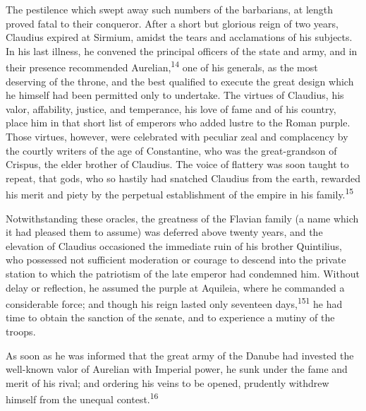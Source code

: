 The pestilence which swept away such numbers of the barbarians,
at length proved fatal to their conqueror. After a short but
glorious reign of two years, Claudius expired at Sirmium, amidst
the tears and acclamations of his subjects. In his last illness,
he convened the principal officers of the state and army, and in
their presence recommended Aurelian,\textsuperscript{14} one of his generals, as
the most deserving of the throne, and the best qualified to
execute the great design which he himself had been permitted only
to undertake. The virtues of Claudius, his valor, affability,
justice, and temperance, his love of fame and of his country,
place him in that short list of emperors who added lustre to the
Roman purple. Those virtues, however, were celebrated with
peculiar zeal and complacency by the courtly writers of the age
of Constantine, who was the great-grandson of Crispus, the elder
brother of Claudius. The voice of flattery was soon taught to
repeat, that gods, who so hastily had snatched Claudius from the
earth, rewarded his merit and piety by the perpetual
establishment of the empire in his family.\textsuperscript{15}



Notwithstanding these oracles, the greatness of the Flavian
family (a name which it had pleased them to assume) was deferred
above twenty years, and the elevation of Claudius occasioned the
immediate ruin of his brother Quintilius, who possessed not
sufficient moderation or courage to descend into the private
station to which the patriotism of the late emperor had condemned
him. Without delay or reflection, he assumed the purple at
Aquileia, where he commanded a considerable force; and though his
reign lasted only seventeen days,\textsuperscript{151} he had time to obtain the
sanction of the senate, and to experience a mutiny of the troops.

As soon as he was informed that the great army of the Danube had
invested the well-known valor of Aurelian with Imperial power, he
sunk under the fame and merit of his rival; and ordering his
veins to be opened, prudently withdrew himself from the unequal
contest.\textsuperscript{16}

